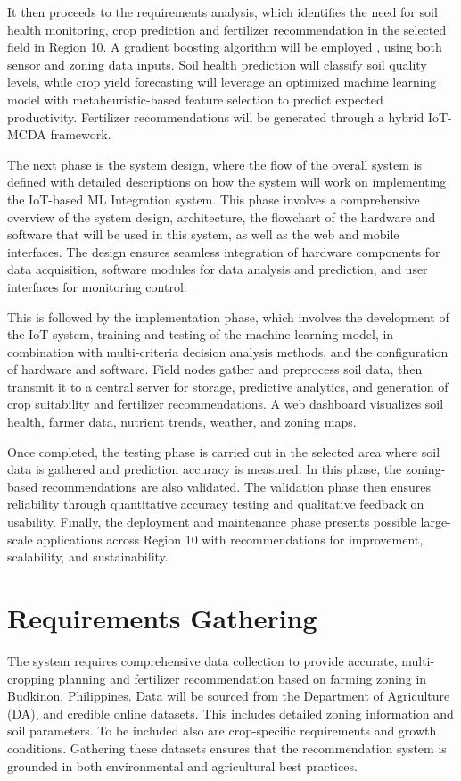 {	It then proceeds to the requirements analysis, which identifies the need for soil health monitoring, crop prediction and fertilizer recommendation in the selected field in Region 10. A gradient boosting algorithm will be employed , using both sensor and zoning data inputs. Soil health prediction will classify soil quality levels, while crop yield forecasting will leverage an optimized machine learning model with metaheuristic-based feature selection to predict expected productivity. Fertilizer recommendations will be generated through a hybrid IoT-MCDA framework. 
	
	The next phase is the system design, where the flow of the overall system is defined with detailed descriptions on how the system will work on implementing the IoT-based ML Integration system.  This phase involves a comprehensive overview of the system design, architecture, the flowchart of the hardware and software that will be used in this system, as well as the web and mobile interfaces. The design ensures seamless integration of hardware components for data acquisition, software modules for data analysis and prediction, and user interfaces for monitoring control.
	
	This is followed by the implementation phase, which involves the development of the IoT system, training and testing of the machine learning model, in combination with multi-criteria decision analysis methods, and the configuration of hardware and software. Field nodes gather and preprocess soil data, then transmit it to a central server for storage, predictive analytics, and generation of crop suitability and fertilizer recommendations. A web dashboard visualizes soil health, farmer data, nutrient trends, weather, and zoning maps.
	
	Once completed, the testing phase is carried out in the selected area where soil data is gathered and prediction accuracy is measured. In this phase, the zoning-based recommendations are also validated. The validation phase then ensures reliability through quantitative accuracy testing and qualitative feedback on usability.  Finally, the deployment and maintenance phase presents possible large-scale applications across Region 10 with recommendations for improvement, scalability, and sustainability.

	\section{Requirements Gathering}
	The system requires comprehensive data collection to provide accurate, multi-cropping planning and fertilizer recommendation based on farming zoning in Budkinon, Philippines. Data will be sourced from the Department of Agriculture (DA), and credible online datasets. This includes detailed zoning information and soil parameters. To be included also are crop-specific requirements and growth conditions. Gathering these datasets ensures that the recommendation system is grounded in both environmental and agricultural best practices.
	 
}
